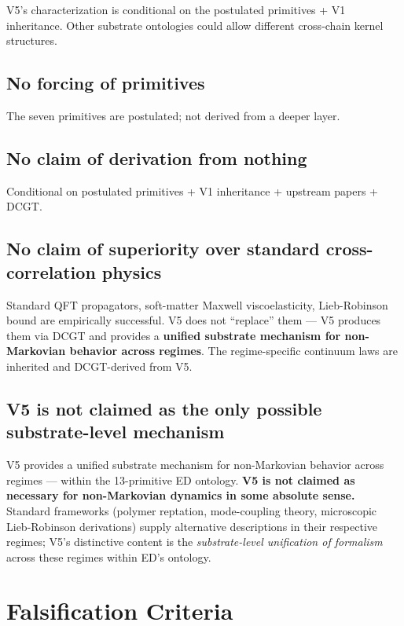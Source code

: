 \documentclass[11pt,a4paper]{article}
\begin{document}
V5's characterization is conditional on the postulated primitives + V1 inheritance. Other substrate ontologies could allow different cross-chain kernel structures.

\subsection{No forcing of primitives}

The seven primitives are postulated; not derived from a deeper layer.

\subsection{No claim of derivation from nothing}

Conditional on postulated primitives + V1 inheritance + upstream papers + DCGT.

\subsection{No claim of superiority over standard cross-correlation physics}

Standard QFT propagators, soft-matter Maxwell viscoelasticity, Lieb-Robinson bound are empirically successful. V5 does not ``replace'' them --- V5 produces them via DCGT and provides a \textbf{unified substrate mechanism for non-Markovian behavior across regimes}. The regime-specific continuum laws are inherited and DCGT-derived from V5.

\subsection{V5 is not claimed as the only possible substrate-level mechanism}

V5 provides a unified substrate mechanism for non-Markovian behavior across regimes --- within the 13-primitive ED ontology. \textbf{V5 is not claimed as necessary for non-Markovian dynamics in some absolute sense.} Standard frameworks (polymer reptation, mode-coupling theory, microscopic Lieb-Robinson derivations) supply alternative descriptions in their respective regimes; V5's distinctive content is the \emph{substrate-level unification of formalism} across these regimes within ED's ontology.

\section{Falsification Criteria}
\end{document}
